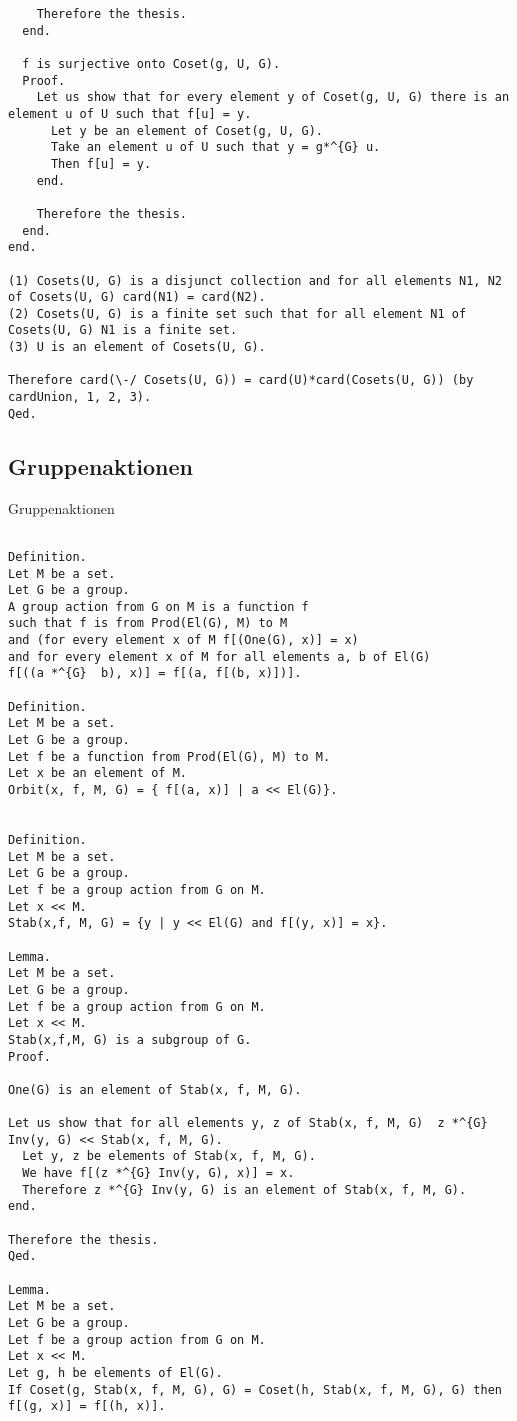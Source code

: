 \documentclass[a4paper,12pt]{scrartcl}
\begin{document}
\begin{lstlisting}
    Therefore the thesis.
  end.

  f is surjective onto Coset(g, U, G).
  Proof.
    Let us show that for every element y of Coset(g, U, G) there is an element u of U such that f[u] = y.
      Let y be an element of Coset(g, U, G).
      Take an element u of U such that y = g*^{G} u.
      Then f[u] = y.
    end.

    Therefore the thesis.
  end.
end.

(1) Cosets(U, G) is a disjunct collection and for all elements N1, N2 of Cosets(U, G) card(N1) = card(N2).
(2) Cosets(U, G) is a finite set such that for all element N1 of Cosets(U, G) N1 is a finite set.
(3) U is an element of Cosets(U, G).

Therefore card(\-/ Cosets(U, G)) = card(U)*card(Cosets(U, G)) (by cardUnion, 1, 2, 3).
Qed.
\end{lstlisting}

\subsection{Gruppenaktionen}

Gruppenaktionen

\begin{lstlisting}

Definition.
Let M be a set.
Let G be a group.
A group action from G on M is a function f
such that f is from Prod(El(G), M) to M
and (for every element x of M f[(One(G), x)] = x)
and for every element x of M for all elements a, b of El(G)
f[((a *^{G}  b), x)] = f[(a, f[(b, x)])].

Definition.
Let M be a set.
Let G be a group.
Let f be a function from Prod(El(G), M) to M.
Let x be an element of M.
Orbit(x, f, M, G) = { f[(a, x)] | a << El(G)}.


Definition.
Let M be a set.
Let G be a group.
Let f be a group action from G on M.
Let x << M.
Stab(x,f, M, G) = {y | y << El(G) and f[(y, x)] = x}.

Lemma.
Let M be a set.
Let G be a group.
Let f be a group action from G on M.
Let x << M.
Stab(x,f,M, G) is a subgroup of G.
Proof.

One(G) is an element of Stab(x, f, M, G).

Let us show that for all elements y, z of Stab(x, f, M, G)  z *^{G} Inv(y, G) << Stab(x, f, M, G).
  Let y, z be elements of Stab(x, f, M, G).
  We have f[(z *^{G} Inv(y, G), x)] = x.
  Therefore z *^{G} Inv(y, G) is an element of Stab(x, f, M, G).
end.

Therefore the thesis.
Qed.

Lemma.
Let M be a set.
Let G be a group.
Let f be a group action from G on M.
Let x << M.
Let g, h be elements of El(G).
If Coset(g, Stab(x, f, M, G), G) = Coset(h, Stab(x, f, M, G), G) then f[(g, x)] = f[(h, x)].


\end{lstlisting}
\end{document}
